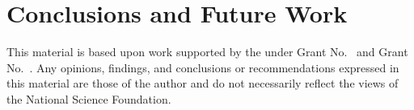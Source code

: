 \documentclass[sigplan,10pt,review,anonymous]{acmart}\settopmatter{printfolios=true,printccs=false,printacmref=false}
\begin{document}




\section{Conclusions and Future Work}\label{sec:conc}

\begin{acks}                            %

  This material is based upon work supported by the
   under Grant
  No.~ and Grant
  No.~.  Any opinions, findings, and
  conclusions or recommendations expressed in this material are those
  of the author and do not necessarily reflect the views of the
  National Science Foundation.
\end{acks}



\end{document}
